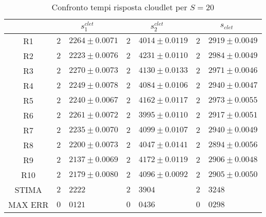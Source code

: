 \begin{table}[!h]
\begin{tabular}{c|r@{.}l|r@{.}l|r@{.}l}
& \multicolumn{2}{|c|}{$s_1^{clet}$}
& \multicolumn{2}{|c|}{$s_2^{clet}$}
& \multicolumn{2}{|c}{$s_{clet}$} 
\\          
\hline
R1      & $2$&$2264 \pm 0.0071$ & $2$&$4014 \pm 0.0119$ & $2$&$2919 \pm 0.0049$ \\
R2      & $2$&$2223 \pm 0.0076$ & $2$&$4231 \pm 0.0110$ & $2$&$2984 \pm 0.0049$ \\
R3      & $2$&$2270 \pm 0.0073$ & $2$&$4130 \pm 0.0133$ & $2$&$2971 \pm 0.0046$ \\
R4      & $2$&$2249 \pm 0.0078$ & $2$&$4084 \pm 0.0106$ & $2$&$2940 \pm 0.0047$ \\
R5      & $2$&$2240 \pm 0.0067$ & $2$&$4162 \pm 0.0117$ & $2$&$2973 \pm 0.0055$ \\
R6      & $2$&$2261 \pm 0.0072$ & $2$&$3995 \pm 0.0110$ & $2$&$2917 \pm 0.0051$ \\
R7      & $2$&$2235 \pm 0.0070$ & $2$&$4099 \pm 0.0107$ & $2$&$2940 \pm 0.0049$ \\
R8      & $2$&$2200 \pm 0.0073$ & $2$&$4047 \pm 0.0141$ & $2$&$2894 \pm 0.0056$ \\
R9      & $2$&$2137 \pm 0.0069$ & $2$&$4172 \pm 0.0119$ & $2$&$2906 \pm 0.0048$ \\
R10     & $2$&$2179 \pm 0.0080$ & $2$&$4096 \pm 0.0092$ & $2$&$2905 \pm 0.0050$ \\
STIMA   & $2$&$2222$            & $2$&$3904$            & $2$&$3248$            \\
MAX ERR & $0$&$0121$            & $0$&$0436$            & $0$&$0298$            
\end{tabular}
\centering
\caption{Confronto tempi risposta cloudlet per $S=20$}
\label{clet_srv_20}
\end{table}

